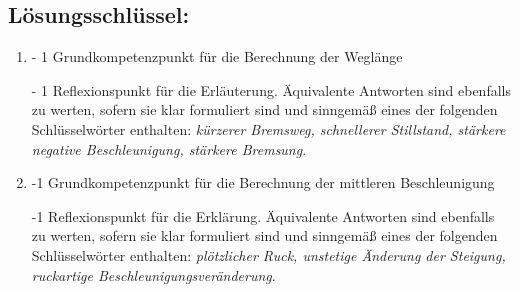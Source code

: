 \begin{langesbeispiel}
{		\subsection{Lösungsschlüssel:}
\begin{enumerate}
	\item - 1 Grundkompetenzpunkt für die Berechnung der Weglänge
	
	- 1 Reflexionspunkt für die Erläuterung. Äquivalente Antworten sind ebenfalls zu werten, sofern sie klar formuliert sind und sinngemäß eines der folgenden Schlüsselwörter enthalten: \textit{kürzerer Bremsweg, schnellerer Stillstand, stärkere negative Beschleunigung, stärkere Bremsung}.
	
	\item -1 Grundkompetenzpunkt für die Berechnung der mittleren Beschleunigung
	
	-1 Reflexionspunkt für die Erklärung. Äquivalente Antworten sind ebenfalls zu werten, sofern sie klar formuliert sind und sinngemäß eines der folgenden Schlüsselwörter enthalten: \textit{plötzlicher Ruck, unstetige Änderung der Steigung, ruckartige Beschleunigungsveränderung}.
			\end{enumerate}
		}
		\end{langesbeispiel}